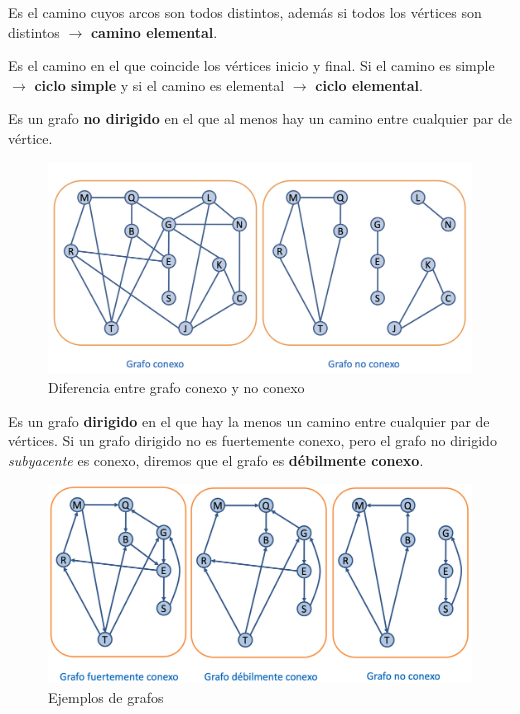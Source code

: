  Es el camino cuyos arcos son todos distintos, además si todos los vértices son distintos \(\rightarrow\) \textbf{camino elemental}.

 Es el camino en el que coincide los vértices inicio y final. Si el camino es simple \(\rightarrow\) \textbf{ciclo simple} y si el camino es elemental \(\rightarrow\) \textbf{ciclo elemental}.

 Es un grafo \textbf{no dirigido} en el que al menos hay un camino entre cualquier par de vértice.
\begin{figure}[h]
  \begin{center}
    \includegraphics[width=.6\textwidth]{assets/intrografo4.png}
  \end{center}
  \caption{Diferencia entre grafo conexo y no conexo}
\end{figure}

 Es un grafo \textbf{dirigido} en el que hay la menos un camino entre cualquier par de vértices. Si un grafo dirigido no es fuertemente conexo, pero el grafo no dirigido \textit{subyacente} es conexo, diremos que el grafo es \textbf{débilmente conexo}.
\begin{figure}[h]
  \begin{center}
    \includegraphics[width=.7\textwidth]{assets/intrografo5.png}
  \end{center}
  \caption{Ejemplos de grafos}
\end{figure}

